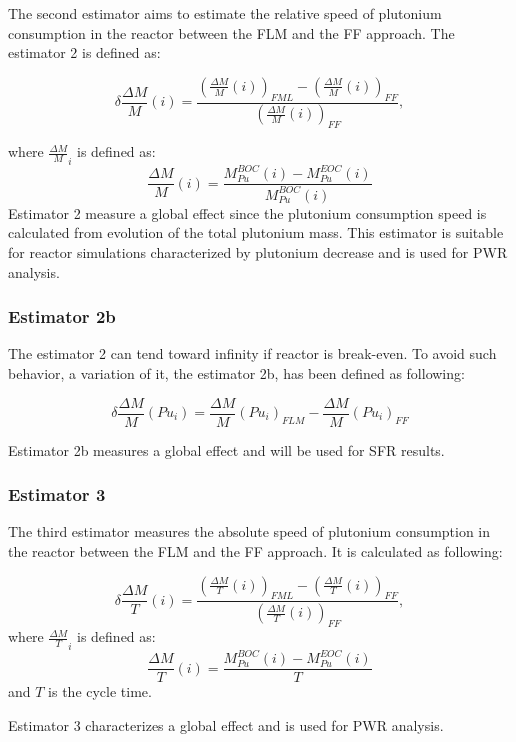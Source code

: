 The second estimator aims to estimate the relative speed of plutonium consumption in the reactor between the \gls{FLM} and the \gls{FF} approach.
The estimator 2 is defined as:

\begin{equation}
    \delta{\frac{\Delta M}{M}}(i) =
        \frac{\left(\frac{\Delta M}{M}(i)\right)_{FML}
              - \left(\frac{\Delta M}{M}(i)\right)_{FF}}
             {\left(\frac{\Delta M}{M}(i)\right)_{FF}},
\end{equation}

where $\frac{\Delta M}{M}_{i}$ is defined as:
\begin{equation}
    \frac{\Delta M}{M}(i) = \frac{M_{Pu}^{BOC}(i) -
    M_{Pu}^{EOC}(i)}{M_{Pu}^{BOC}(i)}
\end{equation}
Estimator 2 measure a global effect since the plutonium consumption speed is calculated from evolution of the total plutonium mass.
This estimator is suitable for reactor simulations characterized by plutonium decrease and is used for \gls{PWR} analysis.

\subsubsection{Estimator 2b}

The estimator 2 can tend toward infinity if reactor is break-even.
To avoid such behavior, a variation of it, the estimator 2b, has been defined as following:

\begin{equation}
    \delta \frac{\Delta M}{M}(Pu_i) = \frac{\Delta M}{M}(Pu_i)_{FLM} - \frac{\Delta M}{M}(Pu_i)_{FF}
\end{equation}

Estimator 2b measures a global effect and will be used for \gls{SFR} results.

\subsubsection{Estimator 3}

The third estimator measures the absolute speed of plutonium consumption in the reactor between the \gls{FLM} and the \gls{FF} approach.
It is calculated as following:

\begin{equation}
    \delta{\frac{\Delta M}{T}}(i) =
        \frac{\left(\frac{\Delta M}{T}(i)\right)_{FML}
              - \left(\frac{\Delta M}{T}(i)\right)_{FF}}
             {\left(\frac{\Delta M}{T}(i)\right)_{FF}},
\end{equation}
where $\frac{\Delta M}{T}_{i}$ is defined as:
\begin{equation}
    \frac{\Delta M}{T}(i) = \frac{M_{Pu}^{BOC}(i) -
    M_{Pu}^{EOC}(i)}{T}
\end{equation}
and $T$ is the cycle time.


Estimator 3 characterizes a global effect and is used for \gls{PWR} analysis.

